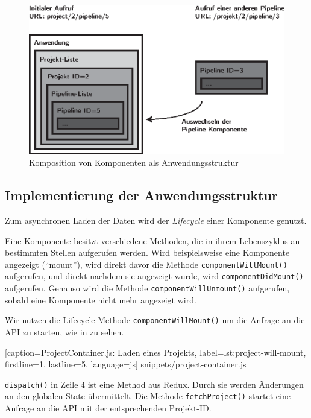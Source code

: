 \begin{figure}[h]
  \caption{Komposition von Komponenten als Anwendungsstruktur}
  \label{fig:komposition}
  \centering
    \includegraphics[width=\textwidth]{assets/komposition}
\end{figure}

\subsection{Implementierung der Anwendungsstruktur}
\label{subsec:implementierung-struktur}

Zum asynchronen Laden der Daten wird der \emph{Lifecycle} einer Komponente genutzt.

Eine Komponente besitzt verschiedene Methoden, die in ihrem Lebenszyklus an bestimmten Stellen aufgerufen werden. Wird beispielsweise eine Komponente angezeigt (``mount''), wird direkt davor die Methode \texttt{componentWillMount()} aufgerufen, und direkt nachdem sie angezeigt wurde, wird \texttt{componentDidMount()} aufgerufen. Genauso wird die Methode \texttt{componentWillUnmount()} aufgerufen, sobald eine Komponente nicht mehr angezeigt wird. \citep[State and Lifecycle]{ReactDocs}

Wir nutzen die Lifecycle-Methode \texttt{componentWillMount()} um die Anfrage an die API zu starten, wie in  zu sehen.


  [caption={ProjectContainer.js: Laden eines Projekts},
  label={lst:project-will-mount},
  firstline=1,
  lastline=5,
  language=js]
  {snippets/project-container.js}

\texttt{dispatch()} in Zeile 4 ist eine Method aus Redux. Durch sie werden Änderungen an den globalen State übermittelt. Die Methode \texttt{fetchProject()} startet eine Anfrage an die API mit der entsprechenden Projekt-ID.

